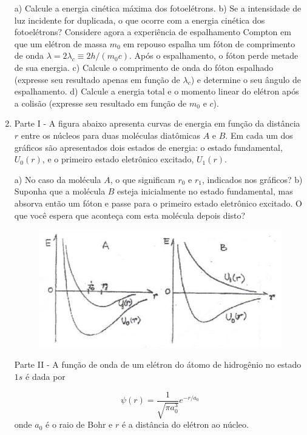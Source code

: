 \begin{enumerate}[start=1,label={\bfseries Q\arabic*.}]
a) Calcule a energia cinética máxima dos fotoelétrons.
b) Se a intensidade de luz incidente for duplicada, o que ocorre com a energia cinética dos fotoelétrons? Considere agora a experiência de espalhamento Compton em que um elétron de massa $m_{0}$ em repouso espalha um fóton de comprimento de onda $\lambda = 2 \lambda_{c} \equiv 2h/(m_{0}c)$. Após o espalhamento, o fóton perde metade de sua energia.
c) Calcule o comprimento de onda do fóton espalhado (expresse seu resultado apenas em função de $\lambda_{c}$) e determine o seu ângulo de espalhamento.
d) Calcule a energia total e o momento linear do elétron após a colisão (expresse seu resultado em função de $m_{0}$ e $c$).





\item Parte I - A figura abaixo apresenta curvas de energia em função da distância $r$ entre os núcleos para duas moléculas diatômicas $A$ e $B$. Em cada um dos gráficos são apresentados dois estados de energia: o estado fundamental, $U_{0}(r)$, e o primeiro estado eletrônico excitado, $U_{1}(r)$.

  a) No caso da molécula $A$, o que significam $r_{0}$ e $r_{1}$, indicados nos gráficos?
  b) Suponha que a molécula $B$ esteja inicialmente no estado fundamental, mas absorva então um fóton e passe para o primeiro estado eletrônico excitado. O que você espera que aconteça com esta molécula depois disto?


\begin{figure}[H]
\centering
\includegraphics[scale=0.8]{moderna-img/potencial.png}
\end{figure}

Parte II - A função de onda de um elétron do átomo de hidrogênio no estado $1s$ é dada por

$$
\psi(r) = \frac{1}{\sqrt{\pi a_{0}^{3}}} e^{-r/a_{0}}
$$
onde $a_{0}$ é o raio de Bohr e $r$ é a distância do elétron ao núcleo.



\end{enumerate}
